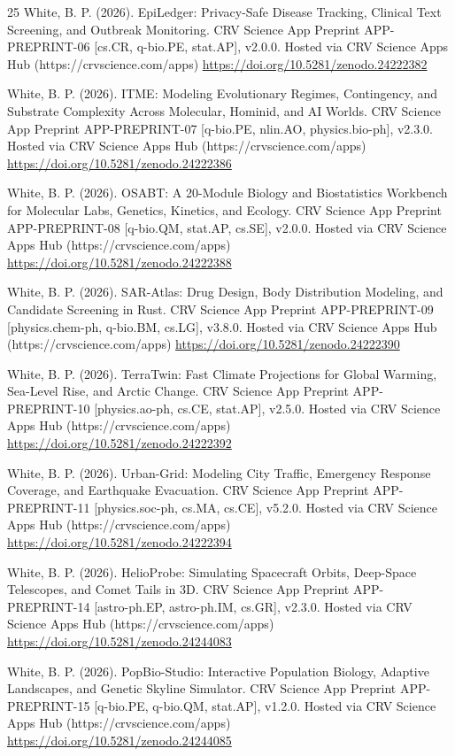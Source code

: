 \documentclass[10pt,letterpaper]{article}
\begin{document}
\begin{thebibliography}{25}
 White, B. P. (2026). EpiLedger: Privacy-Safe Disease Tracking, Clinical Text Screening, and Outbreak Monitoring. CRV Science App Preprint APP-PREPRINT-06 [cs.CR, q-bio.PE, stat.AP], v2.0.0. Hosted via CRV Science Apps Hub (https://crvscience.com/apps) \url{https://doi.org/10.5281/zenodo.24222382}

 White, B. P. (2026). ITME: Modeling Evolutionary Regimes, Contingency, and Substrate Complexity Across Molecular, Hominid, and AI Worlds. CRV Science App Preprint APP-PREPRINT-07 [q-bio.PE, nlin.AO, physics.bio-ph], v2.3.0. Hosted via CRV Science Apps Hub (https://crvscience.com/apps) \url{https://doi.org/10.5281/zenodo.24222386}

 White, B. P. (2026). OSABT: A 20-Module Biology and Biostatistics Workbench for Molecular Labs, Genetics, Kinetics, and Ecology. CRV Science App Preprint APP-PREPRINT-08 [q-bio.QM, stat.AP, cs.SE], v2.0.0. Hosted via CRV Science Apps Hub (https://crvscience.com/apps) \url{https://doi.org/10.5281/zenodo.24222388}

 White, B. P. (2026). SAR-Atlas: Drug Design, Body Distribution Modeling, and Candidate Screening in Rust. CRV Science App Preprint APP-PREPRINT-09 [physics.chem-ph, q-bio.BM, cs.LG], v3.8.0. Hosted via CRV Science Apps Hub (https://crvscience.com/apps) \url{https://doi.org/10.5281/zenodo.24222390}

 White, B. P. (2026). TerraTwin: Fast Climate Projections for Global Warming, Sea-Level Rise, and Arctic Change. CRV Science App Preprint APP-PREPRINT-10 [physics.ao-ph, cs.CE, stat.AP], v2.5.0. Hosted via CRV Science Apps Hub (https://crvscience.com/apps) \url{https://doi.org/10.5281/zenodo.24222392}

 White, B. P. (2026). Urban-Grid: Modeling City Traffic, Emergency Response Coverage, and Earthquake Evacuation. CRV Science App Preprint APP-PREPRINT-11 [physics.soc-ph, cs.MA, cs.CE], v5.2.0. Hosted via CRV Science Apps Hub (https://crvscience.com/apps) \url{https://doi.org/10.5281/zenodo.24222394}

 White, B. P. (2026). HelioProbe: Simulating Spacecraft Orbits, Deep-Space Telescopes, and Comet Tails in 3D. CRV Science App Preprint APP-PREPRINT-14 [astro-ph.EP, astro-ph.IM, cs.GR], v2.3.0. Hosted via CRV Science Apps Hub (https://crvscience.com/apps) \url{https://doi.org/10.5281/zenodo.24244083}

 White, B. P. (2026). PopBio-Studio: Interactive Population Biology, Adaptive Landscapes, and Genetic Skyline Simulator. CRV Science App Preprint APP-PREPRINT-15 [q-bio.PE, q-bio.QM, stat.AP], v1.2.0. Hosted via CRV Science Apps Hub (https://crvscience.com/apps) \url{https://doi.org/10.5281/zenodo.24244085}


\end{thebibliography}
\end{document}
